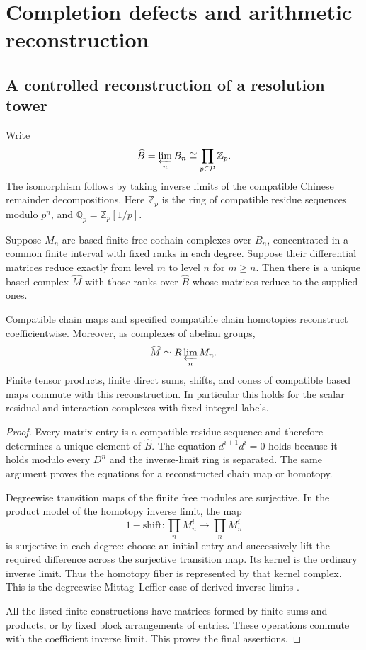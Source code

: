 \section{Completion defects and arithmetic reconstruction}\label{sec:completion-reconstruction}

\subsection{A controlled reconstruction of a resolution tower}

Write
\[
 \widehat B=\varprojlim_n B_n\cong\prod_{p\in\mathcal P}\mathbb Z_p.
\]
The isomorphism follows by taking inverse limits of the compatible Chinese remainder decompositions. Here $\mathbb Z_p$ is the ring of compatible residue sequences modulo $p^n$, and $\mathbb Q_p=\mathbb Z_p[1/p]$.

\begin{theorem}\label{thm:based-tower-reconstruction}
Suppose $M_n$ are based finite free cochain complexes over $B_n$, concentrated in a common finite interval with fixed ranks in each degree. Suppose their differential matrices reduce exactly from level $m$ to level $n$ for $m\geq n$. Then there is a unique based complex $\widehat M$ with those ranks over $\widehat B$ whose matrices reduce to the supplied ones.

Compatible chain maps and specified compatible chain homotopies reconstruct coefficientwise. Moreover, as complexes of abelian groups,
\[
 \widehat M\simeq R\varprojlim_n M_n.
\]
Finite tensor products, finite direct sums, shifts, and cones of compatible based maps commute with this reconstruction. In particular this holds for the scalar residual and interaction complexes with fixed integral labels.
\end{theorem}
\begin{proof}
Every matrix entry is a compatible residue sequence and therefore determines a unique element of $\widehat B$. The equation $d^{i+1}d^i=0$ holds because it holds modulo every $D^n$ and the inverse-limit ring is separated. The same argument proves the equations for a reconstructed chain map or homotopy.

Degreewise transition maps of the finite free modules are surjective. In the product model of the homotopy inverse limit, the map
\[
 1-\mathrm{shift}:\prod_n M_n^i\longrightarrow\prod_n M_n^i
\]
is surjective in each degree: choose an initial entry and successively lift the required difference across the surjective transition map. Its kernel is the ordinary inverse limit. Thus the homotopy fiber is represented by that kernel complex. This is the degreewise Mittag--Leffler case of derived inverse limits \cite{StacksRlim}.

All the listed finite constructions have matrices formed by finite sums and products, or by fixed block arrangements of entries. These operations commute with the coefficient inverse limit. This proves the final assertions.
\end{proof}

